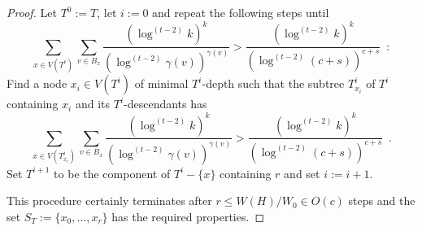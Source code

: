 \documentclass[kpfonts]{patmorin}
\DeclareMathOperator{\pw}{pw}
\theoremstyle{named}
\begin{document}
\begin{proof}
    Let $T^0:=T$, let $i:=0$ and repeat the following steps until
    \[  \sum_{x\in V(T^{i})}\sum_{v\in B_x}\frac{(\log^{(t-2)}k)^k}{(\log^{(t-2)}\gamma(v))^{\gamma(v)}} > \frac{(\log^{(t-2)}k)^k}{(\log^{(t-2)}(c+s))^{c+s}} \enspace :
    \]
    Find a node $x_{i}\in V(T^{i})$ of minimal $T^{i}$-depth such that the subtree $T^{i}_{x_i}$ of $T^{i}$ containing $x_i$ and its $T^{i}$-descendants has
    \[
        \sum_{x\in V(T^{i}_{x_i})}\sum_{v\in B_x}\frac{(\log^{(t-2)}k)^k}{(\log^{(t-2)}\gamma(v))^{\gamma(v)}} > \frac{(\log^{(t-2)}k)^k}{(\log^{(t-2)}(c+s))^{c+s}} \enspace .
    \]
    Set $T^{i+1}$ to be the component of $T^i-\{x\}$ containing $r$ and set $i:=i+1$.

    This procedure certainly terminates after $r\le W(H)/W_0\in O(c)$ steps and the set $S_T:=\{x_0,\ldots,x_r\}$ has the required properties.

\end{proof}
\end{document}
